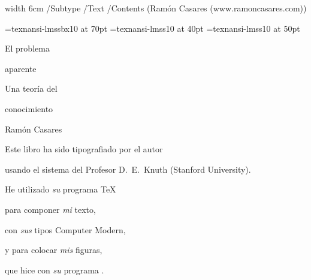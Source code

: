 
\pdfcode%
 \pdfannot width 6cm {/Subtype /Text
  /Contents (Ramón Casares (www.ramoncasares.com))}
\pdfendcode

\null %

\nopagenumbers

\font\titlefont=texnansi-lmssbx10 at 70pt
\font\subtitlefont=texnansi-lmss10 at 40pt
\font\authorfont=texnansi-lmss10 at 50pt

%
%
% 

\pdfWhite

\hbox{}
\vskip1.2in
\centerline{\titlefont El problema}
\vskip1pc
\centerline{\titlefont aparente}

\vskip10pc
\centerline{\subtitlefont Una teoría del}
\vskip6pt
\centerline{\subtitlefont conocimiento}

\vskip2pc
\centerline{\authorfont Ramón Casares}

\pdfBlack

\vfil

\break %

\null \vfill

 Este libro ha sido tipografiado por el autor\par
 usando el sistema del Profesor D.~E.~Knuth (Stanford University).\par
 He utilizado {\em su} programa \TeX\par
 para componer {\em mi} texto,\par
 con {\em sus} tipos Computer Modern,\par
 y para colocar {\em mis} figuras,\par
 que hice con {\em su} programa \METAFONT.\par

